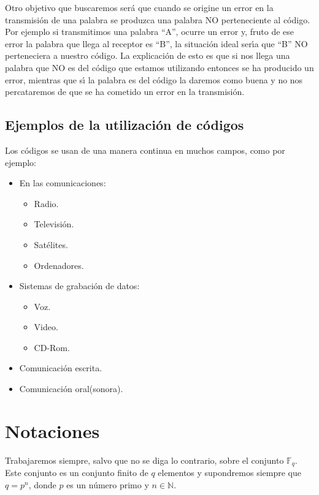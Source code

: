 Otro objetivo que buscaremos ser\'a que cuando se origine un error en la
transmisi\'on de una palabra se produzca una palabra NO perteneciente al
c\'odigo. Por ejemplo si transmitimos una palabra ``A'', ocurre un error y,
fruto de ese error la palabra que llega al receptor es ``B'', la situaci\'on
ideal ser\'{\i}a que ``B'' NO perteneciera a nuestro c\'odigo. La explicaci\'on
de esto es que si nos llega una palabra que NO es del c\'odigo que estamos
utilizando entonces se ha producido un error, mientras que s\'{\i} la palabra
es del c\'odigo la daremos como buena y no nos percataremos de que se ha 
cometido un error en la transmisi\'on.
%
\newpage
%
\subsection{Ejemplos de la utilizaci\'on de c\'odigos}

Los c\'odigos se usan de una manera continua en muchos campos, como por ejemplo:

\begin{itemize}
\item En las comunicaciones:
\begin{itemize}
\item Radio.
\item Televisi\'on.
\item Sat\'elites.
\item Ordenadores.
\end{itemize}
\item Sistemas de grabaci\'on de datos:
\begin{itemize}
\item Voz.
\item Video.
\item CD-Rom.
\end{itemize}
\item Comunicaci\'on escrita.
\item Comunicaci\'on oral(sonora).
\end{itemize}

\section{Notaciones}

Trabajaremos siempre, salvo que no se diga lo contrario, sobre el conjunto
$\mathbb{F}_q$. Este conjunto es un conjunto finito de $q$ elementos y
supondremos siempre que $q=p^n$, donde $p$ es un n\'umero primo y $n\in
\mathbb{N}$.\\

